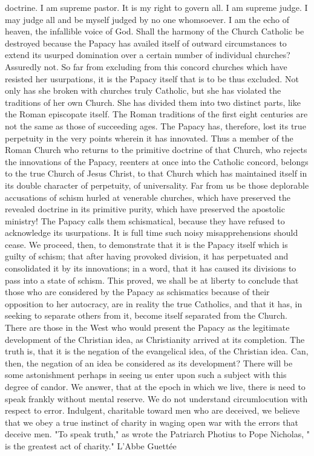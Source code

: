 doctrine. I am supreme pastor. It is my right to govern all. I am supreme judge. I may judge all and be myself judged by no one whomsoever. I am the echo of heaven, the infallible voice of God. Shall the harmony of the Church Catholic be destroyed because the Papacy has availed itself of outward circumstances to extend its usurped domination over a certain number of individual churches? Assuredly not. So far from excluding from this concord churches which have resisted her usurpations, it is the Papacy itself that is to be thus excluded. Not only has she broken with churches truly Catholic, but she has violated the traditions of her own Church. She has divided them into two distinct parts, like the Roman episcopate itself. The Roman traditions of the first eight centuries are not the same as those of succeeding ages. The Papacy has, therefore, lost its true perpetuity in the very points wherein it has innovated. Thus a member of the Roman Church who returns to the primitive doctrine of that Church, who rejects the innovations of the Papacy, reenters at once into the Catholic concord, belongs to the true Church of Jesus Christ, to that Church which has maintained itself in its double character of perpetuity, of universality. Far from us be those deplorable accusations of schism hurled at venerable churches, which have preserved the revealed doctrine in its primitive purity, which have preserved the apostolic ministry! The Papacy calls them schismatical, because they have refused to acknowledge its usurpations. It is full time such noisy misapprehensions should cease. We proceed, then, to demonstrate that it is the Papacy itself which is guilty of schism; that after having provoked division, it has perpetuated and consolidated it by its innovations; in a word, that it has caused its divisions to pass into a state of schism. This proved, we shall be at liberty to conclude that those who are considered by the Papacy as schismatics because of their opposition to her autocracy, are in reality the true Catholics, and that it has, in seeking to separate others from it, become itself separated from the Church. There are those in the West who would present the Papacy as the legitimate development of the Christian idea, as Christianity arrived at its completion. The truth is, that it is the negation of the evangelical idea, of the Christian idea. Can, then, the negation of an idea be considered as its development? There will be some astonishment perhaps in seeing us enter upon such a subject with this degree of candor. We answer, that at the epoch in which we live, there is need to speak frankly without mental reserve. We do not understand circumlocution with respect to error. Indulgent, charitable toward men who are deceived, we believe that we obey a true instinct of charity in waging open war with the errors that deceive men. "To speak truth," as wrote the Patriarch Photius to Pope Nicholas, " is the greatest act of charity." L'Abbe Guettée

